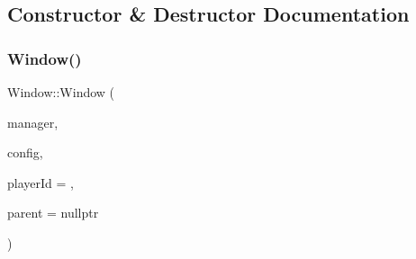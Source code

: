 \subsection{Constructor \& Destructor Documentation}
\mbox{\label{class_q_g_b_a_1_1_window_ad0f32ffced44b9d2f3121927a7d7634d}} 
\subsubsection{\texorpdfstring{Window()}{Window()}}
{\footnotesize\ttfamily Window\+::\+Window (\begin{DoxyParamCaption}\item[{\mbox{\hyperlink{class_q_g_b_a_1_1_core_manager}{Core\+Manager}} $\ast$}]{manager,  }\item[{\mbox{\hyperlink{class_q_g_b_a_1_1_config_controller}{Config\+Controller}} $\ast$}]{config,  }\item[{\mbox{\hyperlink{ioapi_8h_a787fa3cf048117ba7123753c1e74fcd6}{int}}}]{player\+Id = {},  }\item[{Q\+Widget $\ast$}]{parent = {\ttfamily nullptr} }\end{DoxyParamCaption})}


